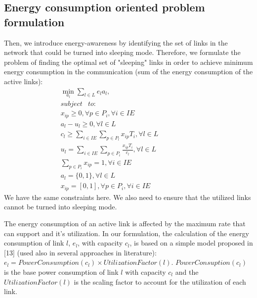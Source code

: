 \documentclass[journal]{IEEEtran}
\begin{document}
\subsection{Energy consumption oriented problem formulation}
Then, we introduce energy-awareness by identifying the set of links in the network that could be turned into sleeping mode. Therefore, we formulate the problem of finding the optimal set of "sleeping" links in order to achieve minimum energy consumption in the communication (sum of the energy consumption of the active links):
\[\begin{array}{c}
\mathop {\min }\limits_{{a_l}} \sum\limits_{l \in L} {{e_l}{a_l}} ,\\
subject\begin{array}{*{20}{c}}
{}
\end{array}to:\begin{array}{*{20}{c}}
{}&{}&{}&{}&{}&{}&{}&{}&{}&{}&{}&{}&{}&{}&{}&{}&{}&{}
\end{array}\\
{x_{ip}} \ge 0,\forall p \in {P_i},\forall i \in IE\\
{a_l} - {u_l} \ge 0,\forall l \in L\\
{c_l} \ge \sum\limits_{i \in IE} {\sum\limits_{p \in {P_l}} {{x_{ip}}{T_i},\forall l \in L} } \\
{u_l} = \sum\limits_{i \in IE} {\sum\limits_{p \in {P_i}} {\frac{{{x_{ip}}{T_i}}}{{{c_l}}},\forall l \in L} } \\
\sum\limits_{p \in {P_i}} {{x_{ip}} = 1,} \forall i \in IE\\
{a_l} = \{ 0,1\} ,\forall l \in L\\
{x_{ip}} = [0,1],\forall p \in {P_i},\forall i \in IE
\end{array}\]
We have the same constraints here. We also need to ensure that the utilized links cannot be turned into sleeping mode.

The energy consumption of an active link is affected by the maximum rate that can support and it's utilization. In our formulation, the calculation of the energy consumption of link \(l\), \(e_l\), with capacity \(c_l\), is based on a simple model proposed in [13] (used also in several approaches in literature):
\({e_l} = PowerConsumption({c_l}) \times UtilizationFactor(l).\)
\(PowerConsuption(c_l)\) is the base power consumption of link \(l\) with capacity \(c_l\) and the \(UtilizationFactor(l)\) is the scaling factor to account for the utilization of each link.
\end{document}
